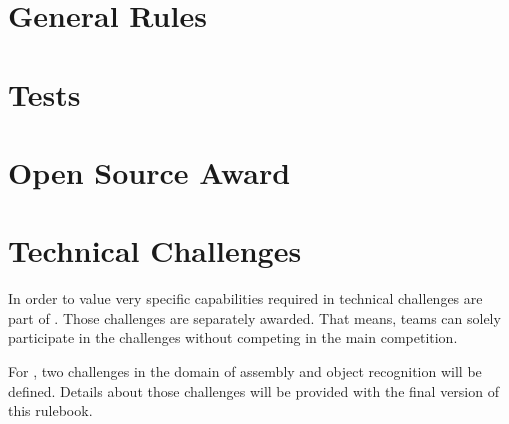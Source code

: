 \documentclass[11pt, twoside, openright, a4paper, chapterprefix]{scrbook}
\begin{document}
\chapter{General Rules}




\chapter{Tests}




\chapter{Open Source Award}


\chapter{Technical Challenges} \label{cha:TechnicalChallenges}
In order to value very specific capabilities required in \RCAW technical challenges are part of \RCAW. Those challenges are separately awarded. That means, teams can solely participate in the challenges without competing in the main competition. 

For \YEAR, two challenges in the domain of assembly and object recognition will be defined. Details about those challenges will be provided with the final version of this rulebook. 

%


\printabx
\printidx
\end{document}
